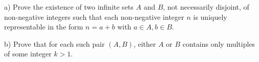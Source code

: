 a) Prove the existence of two infinite sets $A$ and $B$,  not necessarily disjoint, of non-negative integers such that each non-negative integer $n$ is uniquely representable in the form $n=a+b$ with $a\in A,b\in B$.

b) Prove that for each such pair $(A,B)$,  either $A$ or $B$ contains only multiples of some integer $k>1$.